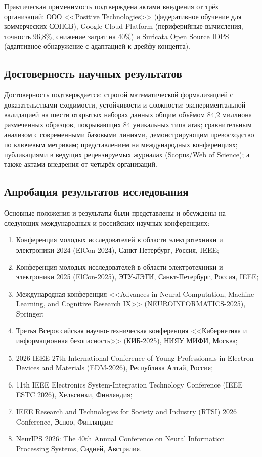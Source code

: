 \documentclass[12pt,a5paper]{article}
\begin{document}
Практическая применимость подтверждена актами внедрения от трёх организаций: ООО <<Positive Technologies>> (федеративное обучение для коммерческих СОПСВ), Google Cloud Platform (периферийные вычисления, точность 96,8\%, снижение затрат на 40\%) и Suricata Open Source IDPS (адаптивное обнаружение с адаптацией к дрейфу концепта).

\subsection*{Достоверность научных результатов}

Достоверность подтверждается: строгой математической формализацией с доказательствами сходимости, устойчивости и сложности; экспериментальной валидацией на шести открытых наборах данных общим объёмом 84,2 миллиона размеченных образцов, покрывающих 84 уникальных типа атак; сравнительным анализом с современными базовыми линиями, демонстрирующим превосходство по ключевым метрикам; представлением на международных конференциях; публикациями в ведущих рецензируемых журналах (Scopus/Web of Science); а также актами внедрения от четырёх организаций.

\subsection*{Апробация результатов исследования}

Основные положения и результаты были представлены и обсуждены на следующих международных и российских научных конференциях:

\begin{enumerate}
\item Конференция молодых исследователей в области электротехники и электроники 2024 (ElCon-2024), Санкт-Петербург, Россия, IEEE;
\item Конференция молодых исследователей в области электротехники и электроники 2025 (ElCon-2025), ЭТУ-ЛЭТИ, Санкт-Петербург, Россия, IEEE;
\item Международная конференция <<Advances in Neural Computation, Machine Learning, and Cognitive Research IX>> (NEUROINFORMATICS-2025), Springer;
\item Третья Всероссийская научно-техническая конференция <<Кибернетика и информационная безопасность>> (КИБ-2025), НИЯУ МИФИ, Москва;
\item 2026 IEEE 27th International Conference of Young Professionals in Electron Devices and Materials (EDM-2026), Республика Алтай, Россия;
\item 11th IEEE Electronics System-Integration Technology Conference (IEEE ESTC 2026), Хельсинки, Финляндия;
\item IEEE Research and Technologies for Society and Industry (RTSI) 2026 Conference, Эспоо, Финляндия;
\item NeurIPS 2026: The 40th Annual Conference on Neural Information Processing Systems, Сидней, Австралия.
\end{enumerate}
\end{document}
